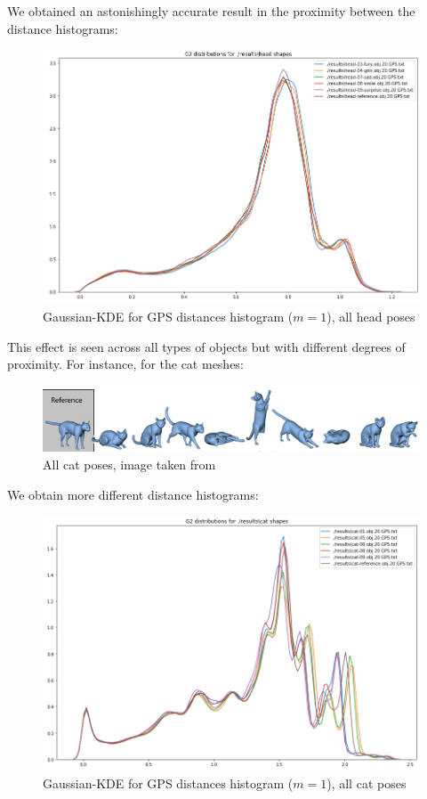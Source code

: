 \documentclass[conference]{IEEEtran}
\begin{document}
We obtained an astonishingly accurate result in the proximity between the distance histograms:

\begin{figure}[H]
    \centering
    \includegraphics[width=0.9\columnwidth]{face_gps.png}
    \caption{Gaussian-KDE for GPS distances histogram ($m=1$), all \textsf{head} poses}
    \label{fig:face_gps}
\end{figure}

This effect is seen across all types of objects but with different degrees of proximity. For instance, for the \textsf{cat} meshes:

\begin{figure}[H]
    \centering
    \includegraphics[width=\columnwidth]{cat_all.png}
    \caption{All \textsf{cat} poses, image taken from \cite{Sumner04}}
    \label{fig:cat_all}
\end{figure}

We obtain more different distance histograms:

\begin{figure}[H]
    \centering
    \includegraphics[width=0.9\columnwidth]{cat_gps.png}
    \caption{Gaussian-KDE for GPS distances histogram ($m=1$), all \textsf{cat} poses}
    \label{fig:cat_gps}
\end{figure}
\end{document}
